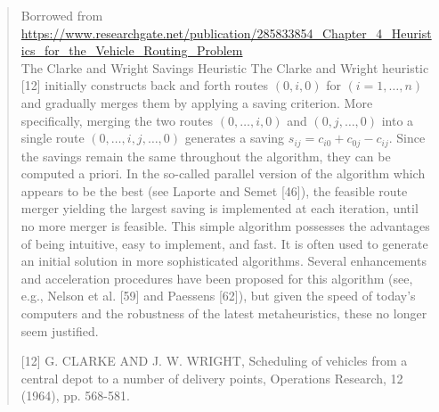 \begin{quote}
Borrowed from \url{https://www.researchgate.net/publication/285833854_Chapter_4_Heuristics_for_the_Vehicle_Routing_Problem} \\

The Clarke and Wright Savings Heuristic
The Clarke and Wright heuristic [12] initially constructs back and forth routes $(0, i, 0)$ for $(i=1, \ldots, n)$ and gradually merges them by applying a saving criterion. More specifically, merging the two routes $(0, \ldots, i, 0)$ and $(0, j, \ldots, 0)$ into a single route $(0, \ldots, i, j, \ldots, 0)$ generates a saving $s_{i j}=c_{i 0}+c_{0 j}-c_{i j}$. Since the savings remain the same throughout the algorithm, they can be computed a priori. In the so-called parallel version of the algorithm which appears to be the best (see Laporte and Semet [46]), the feasible route merger yielding the largest saving is implemented at each iteration, until no more merger is feasible. This simple algorithm possesses the advantages of being intuitive, easy to implement, and fast. It is often used to generate an initial solution in more sophisticated algorithms. Several enhancements and acceleration procedures have been proposed for this algorithm (see, e.g., Nelson et al. [59] and Paessens [62]), but given the speed of today's computers and the robustness of the latest metaheuristics, these no longer seem justified.

[12] G. CLARKE AND J. W. WRIGHT, Scheduling of vehicles from a central depot to a number of delivery points, Operations Research, 12 (1964), pp. 568-581.
\end{quote}



